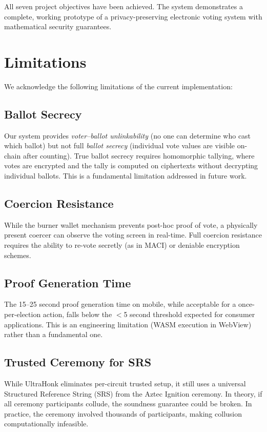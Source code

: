 All seven project objectives have been achieved. The system demonstrates a complete, working prototype of a privacy-preserving electronic voting system with mathematical security guarantees.

\section{Limitations}

We acknowledge the following limitations of the current implementation:

\subsection{Ballot Secrecy}

Our system provides \textit{voter--ballot unlinkability} (no one can determine who cast which ballot) but not full \textit{ballot secrecy} (individual vote values are visible on-chain after counting). True ballot secrecy requires homomorphic tallying, where votes are encrypted and the tally is computed on ciphertexts without decrypting individual ballots. This is a fundamental limitation addressed in future work.

\subsection{Coercion Resistance}

While the burner wallet mechanism prevents post-hoc proof of vote, a physically present coercer can observe the voting screen in real-time. Full coercion resistance requires the ability to re-vote secretly (as in MACI) or deniable encryption schemes.

\subsection{Proof Generation Time}

The 15--25 second proof generation time on mobile, while acceptable for a once-per-election action, falls below the $<$5 second threshold expected for consumer applications. This is an engineering limitation (WASM execution in WebView) rather than a fundamental one.

\subsection{Trusted Ceremony for SRS}

While UltraHonk eliminates per-circuit trusted setup, it still uses a universal Structured Reference String (SRS) from the Aztec Ignition ceremony. In theory, if all ceremony participants collude, the soundness guarantee could be broken. In practice, the ceremony involved thousands of participants, making collusion computationally infeasible.

